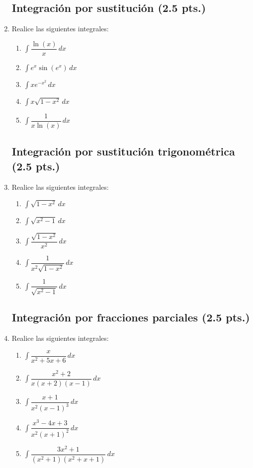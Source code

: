 \documentclass[letterpaper]{article}
\renewcommand{\*}{\cdot}
\theoremstyle{definition}
\begin{document}
\begin{enumerate}
\subsection*{Integración por sustitución (2.5 pts.)}
\item  Realice las siguientes integrales:
\begin{enumerate}
\item$\displaystyle \int \dfrac{\ln(x)}{x} \, dx$
\item$\displaystyle \int e^x \sin(e^x) \, dx$
\item$\displaystyle \int xe^{-x^2} \, dx$
\item$\displaystyle \int x\sqrt{1- x^2} \, dx$
\item$\displaystyle \int \dfrac{1}{x \ln(x)} \, dx$
\end{enumerate}

\subsection*{Integración por sustitución trigonométrica (2.5 pts.)}
\item  Realice las siguientes integrales:
\begin{enumerate}
\item$\displaystyle \int \sqrt{1 - x^2} \, dx$
\item$\displaystyle \int \sqrt{x^2 - 1} \, dx$
\item$\displaystyle \int \dfrac{\sqrt{1 - x^2}}{x^2} \, dx$
\item$\displaystyle \int  \dfrac{1}{x^2 \sqrt{1 - x^2}} \, dx$
\item$\displaystyle \int  \dfrac{1}{ \sqrt{x^2 - 1}} \, dx$
\end{enumerate}

\subsection*{Integración por fracciones parciales (2.5 pts.)}
\item  Realice las siguientes integrales:
\begin{enumerate}
\item$\displaystyle \int \dfrac{x}{x^2 + 5x + 6} \, dx$
\item$\displaystyle \int \dfrac{x^2 +2}{x(x+2)(x-1)} \, dx$
\item$\displaystyle \int \dfrac{x + 1}{x^2(x-1)^3} \, dx$
\item$\displaystyle \int \dfrac{x^3 - 4x + 3}{x^2(x+1)^2} \, dx$
\item$\displaystyle \int  \dfrac{3x^2 + 1}{(x^2 +1 ) (x^2 + x +1)} \, dx$
\end{enumerate}

 \end{enumerate}
\end{document}
